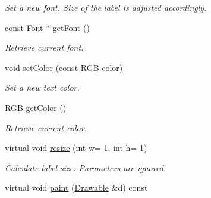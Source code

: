 \begin{DoxyCompactItemize}
\begin{DoxyCompactList}\small\item\em Set a new font. Size of the label is adjusted accordingly. \end{DoxyCompactList}\item 
\hypertarget{classGUI_1_1Label_a396846f4fb4728816c37d43985ca95dc}{const \hyperlink{classGUI_1_1Font}{Font} $\ast$ \hyperlink{classGUI_1_1Label_a396846f4fb4728816c37d43985ca95dc}{get\-Font} ()}\label{classGUI_1_1Label_a396846f4fb4728816c37d43985ca95dc}

\begin{DoxyCompactList}\small\item\em Retrieve current font. \end{DoxyCompactList}\item 
\hypertarget{classGUI_1_1Label_a777ec1e46d719b55d5ca04e0b92203d2}{void \hyperlink{classGUI_1_1Label_a777ec1e46d719b55d5ca04e0b92203d2}{set\-Color} (const \hyperlink{namespaceGUI_aeafd135255365f3584da0e982fc79466}{R\-G\-B} color)}\label{classGUI_1_1Label_a777ec1e46d719b55d5ca04e0b92203d2}

\begin{DoxyCompactList}\small\item\em Set a new text color. \end{DoxyCompactList}\item 
\hypertarget{classGUI_1_1Label_aae93d1b80ef6ccc6dbcad1d3e01d0e49}{\hyperlink{namespaceGUI_aeafd135255365f3584da0e982fc79466}{R\-G\-B} \hyperlink{classGUI_1_1Label_aae93d1b80ef6ccc6dbcad1d3e01d0e49}{get\-Color} ()}\label{classGUI_1_1Label_aae93d1b80ef6ccc6dbcad1d3e01d0e49}

\begin{DoxyCompactList}\small\item\em Retrieve current color. \end{DoxyCompactList}\item 
\hypertarget{classGUI_1_1Label_a0a19005bc37fac28c857036e8dc48b2e}{virtual void \hyperlink{classGUI_1_1Label_a0a19005bc37fac28c857036e8dc48b2e}{resize} (int w=-\/1, int h=-\/1)}\label{classGUI_1_1Label_a0a19005bc37fac28c857036e8dc48b2e}

\begin{DoxyCompactList}\small\item\em Calculate label size. Parameters are ignored. \end{DoxyCompactList}\item 
\hypertarget{classGUI_1_1Label_a797c2ce94314014b2775114a046c67b7}{virtual void \hyperlink{classGUI_1_1Label_a797c2ce94314014b2775114a046c67b7}{paint} (\hyperlink{classGUI_1_1Drawable}{Drawable} \&d) const }\label{classGUI_1_1Label_a797c2ce94314014b2775114a046c67b7}


\end{DoxyCompactItemize}
